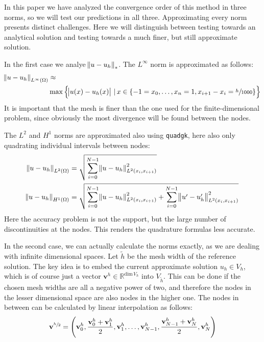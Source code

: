 \documentclass[headsepline,footsepline,footinclude=false,oneside,fontsize=11pt,paper=a4,listof=totoc,bibliography=totoc]{scrbook} %
\begin{document}
In this paper we have analyzed the convergence order of this method in three norms, so we will test our predictions in all three. Approximating every norm presents distinct challenges. Here we will distinguish between testing towards an analytical solution and testing towards a much finer, but still approximate solution.

In the first case we analye $\norm{u-u_h}_*$. The $L^\infty$ norm is approximated as follows:
\begin{align}
\norm{u-u_h}_{L^\infty(\Omega)} &\approx \\ &\max \left\{\abs{u(x) - u_h(x)} \,|\, x \in \{-1 = x_0,\dots, x_n = 1, x_{i+1} - x_i = \sfrac{h}{1000}\} \right\} \nonumber 
\end{align}
It is important that the mesh is finer than the one used for the finite-dimensional problem, since obviously the most divergence will be found between the nodes.

The $L^2$ and $H^1$ norms are approximated also using \verb|quadgk|, here also only quadrating individual intervals between nodes:
\begin{align}
\begin{split}
	\norm{u-u_h}_{L^2(\Omega)} &= \sqrt{\sum_{i=0}^{N-1} \norm{u-u_h}_{L^2(x_i, x_{i+1})}^2 } \\
	\norm{u-u_h}_{H^1(\Omega)} &= \sqrt{\sum_{i=0}^{N-1} \norm{u-u_h}_{L^2(x_i, x_{i+1})}^2 + \sum_{i=0}^{N-1} \norm{u'-u_h'}_{L^2(x_i, x_{i+1})}^2} 
\end{split}
\end{align}
 Here the accuracy problem is not the support, but the large number of discontinuities at the nodes. This renders the quadrature formulas less accurate.

In the second case, we can actually calculate the norms exactly, as we are dealing with infinite dimensional spaces. Let $\tilde{h}$ be the mesh width of the reference solution. The key idea is to embed the current approximate solution $u_h \in V_h$, which is of course just a vector $\mathbf{v}^h \in \mathbb{R}^{\mathrm{dim}\, V_h}$ into $V_{\tilde{h}}$. This can be done if the chosen mesh widths are all a negative power of two, and therefore the nodes in the lesser dimensional space are also nodes in the higher one. The nodes in between can be calculated by linear interpolation as follows:
\begin{align*}
	\mathbf{v}^{\sfrac{h}{2}} = \left(\mathbf{v}^h_0, \frac{\mathbf{v}^h_0 + \mathbf{v}^h_1}{2} , \mathbf{v}^h_1, \dots, \mathbf{v}^h_{N-1}, \frac{\mathbf{v}^h_{N-1} + \mathbf{v}^h_N}{2}, \mathbf{v}^h_N \right)
\end{align*}
\end{document}
